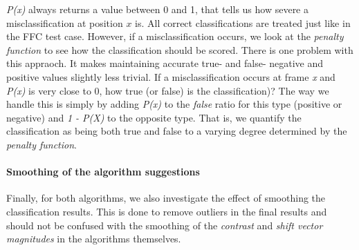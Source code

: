 \emph{P(x)} always returns a value between 0 and 1, that tells us how severe a misclassification at position $x$ is. All correct classifications are treated just like in the FFC test case. However, if a misclassification occurs, we look at the \textit{penalty function} to see how the classification should be scored. There is one problem with this appraoch. It makes maintaining accurate true- and false- negative and positive values slightly less trivial. If a misclassification occurs at frame \textit{x} and \emph{P(x)} is very close to 0, how true (or false) is the classification)? The way we handle this is simply by adding \textit{P(x)} to the \textit{false} ratio for this type (positive or negative) and \textit{1 - P(X)} to the opposite type. That is, we quantify the classification as being both true and false to a varying degree determined by the \textit{penalty function}.
%
\paragraph{Smoothing of the algorithm suggestions}
%
Finally, for both algorithms, we also investigate the effect of smoothing the classification results. This is done to remove outliers in the final results and should not be confused with the smoothing of the \textit{contrast} and \textit{shift vector magnitudes} in the algorithms themselves.
%
